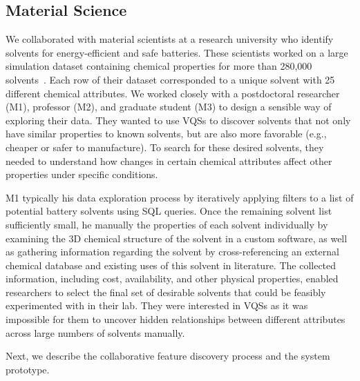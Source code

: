  \subsection{Material Science}
 \par\noindent{} 
 \npar We collaborated with material scientists at a research university who identify solvents for energy-efficient and safe batteries. These scientists worked on a large simulation dataset containing chemical properties for more than 280,000 solvents~\cite{Khetan2018}. Each row of their dataset corresponded to a unique solvent with 25 different chemical attributes. We worked closely with a postdoctoral researcher (M1), professor (M2), and graduate student (M3) to design a sensible way of exploring their data. They wanted to use VQSs to discover solvents that not only have similar properties to known solvents, but are also more favorable (e.g., cheaper or safer to manufacture). To search for these desired solvents, they needed to understand how changes in certain chemical attributes affect other properties under specific conditions.
 \par\noindent{} 
 \npar M1 typically  his data exploration process by iteratively applying filters to a list of potential battery solvents using SQL queries. Once the remaining solvent list  sufficiently small, he manually  the properties of each solvent individually by examining the 3D chemical structure of the solvent in a custom software, as well as gathering information regarding the solvent by cross-referencing an external chemical database and existing uses of this solvent in literature. The collected information, including cost, availability, and other physical properties, enabled researchers to select the final set of desirable solvents that could be feasibly experimented with in their lab. They were interested in VQSs as it was impossible for them to uncover hidden relationships between different attributes across large numbers of solvents manually.%
 \par Next, we describe the collaborative feature discovery process and the  system prototype.
 